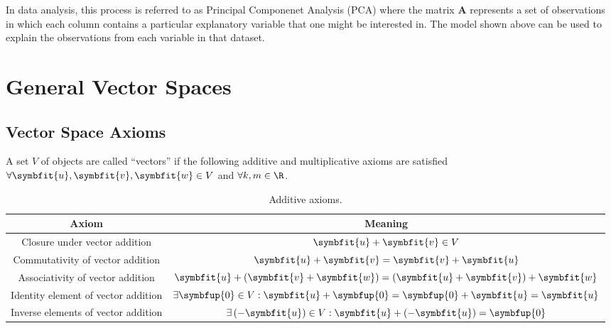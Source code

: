 \documentclass{article}
\begin{document}
\begin{multicols*}{3}
    In data analysis, this process is referred to as Principal Componenet Analysis (PCA) where the matrix
    \(\symbf{A}\) represents a set of observations in which each column contains a particular explanatory variable
    that one might be interested in. The model shown above can be used to explain the observations from each
    variable in that dataset.
    \section{General Vector Spaces}
    \subsection{Vector Space Axioms}
    A set \(V\) of objects are called ``vectors'' if the following additive and multiplicative axioms
    are satisfied \(\forall \symbfit{u}, \symbfit{v}, \symbfit{w} \in V\) and \(\forall k, m \in \R\).
    \begin{table}[H]
        \centering
        \begin{tabular}{c c}
            \toprule
            \textbf{Axiom}                      & \textbf{Meaning}                                                                                                    \\
            \midrule
            Closure under vector addition       & \(\symbfit{u} + \symbfit{v} \in V\)                                                                                 \\
            Commutativity of vector addition    & \(\symbfit{u} + \symbfit{v} = \symbfit{v} + \symbfit{u}\)                                                           \\
            Associativity of vector addition    & \(\symbfit{u} + \left( \symbfit{v} + \symbfit{w} \right) = \left( \symbfit{u} + \symbfit{v} \right) + \symbfit{w}\) \\
            Identity element of vector addition & \(\exists \symbfup{0} \in V : \symbfit{u} + \symbfup{0} = \symbfup{0} + \symbfit{u} = \symbfit{u}\)                 \\
            Inverse elements of vector addition & \(\exists \left( -\symbfit{u} \right) \in V : \symbfit{u} + \left( -\symbfit{u} \right) = \symbfup{0}\)             \\
            \bottomrule
        \end{tabular}
        \caption{Additive axioms.} %
    \end{table}
    \begin{table}[H]

\end{table}
\end{multicols*}
\end{document}
